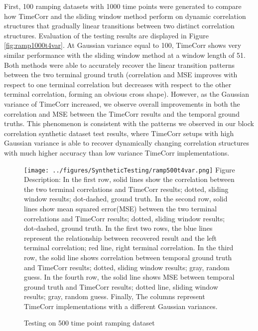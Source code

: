 \documentclass[11pt]{article}
\begin{document}
First, 100 ramping datasets with 1000 time points were generated to compare how TimeCorr and the sliding window method perform on dynamic correlation structures that gradually linear transitions between two distinct correlation structures. Evaluation of the testing results are displayed in Figure \ref{fig:ramp1000t4var}. At Gaussian variance equal to 100, TimeCorr shows very similar performance with the sliding window method at a window length of 51. Both methods were able to accurately recover the linear transition patterns between the two terminal ground truth (correlation and MSE improves with respect to one terminal correlation but decreases with respect to the other terminal correlation, forming an obvious cross shape). However, as the Gaussian variance of TimeCorr increased, we observe overall improvements in both the correlation and MSE between the TimeCorr results and the temporal ground truths. This phenomenon is consistent with the patterns we observed in our block correlation synthetic dataset test results, where TimeCorr setups with high Gaussian variance is able to recover dynamically changing correlation structures with much higher accuracy than low variance TimeCorr implementations.

\begin{figure}[!htb]
\caption{Testing on 500 time point ramping dataset}
\texttt{[image: ../figures/SyntheticTesting/ramp500t4var.png]}
\label{fig:ramp500t4var}
Figure Description: In the first row, solid lines show the correlation between the two terminal correlations and TimeCorr results; dotted, sliding window results; dot-dashed, ground truth. In the second row, solid lines show mean squared error(MSE) between the two terminal correlations and TimeCorr results; dotted, sliding window results; dot-dashed, ground truth. In the first two rows, the blue lines represent the relationship between recovered result and the left terminal correlation; red line, right terminal correlation. In the third row, the solid line shows correlation between temporal ground truth and TimeCorr results; dotted, sliding window results; gray, random guess. In the fourth row, the solid line shows MSE between temporal ground truth and TimeCorr results; dotted line, sliding window results; gray, random guess. Finally, The columns represent TimeCorr implementations with a different Gaussian variances.
\end{figure}
\end{document}
